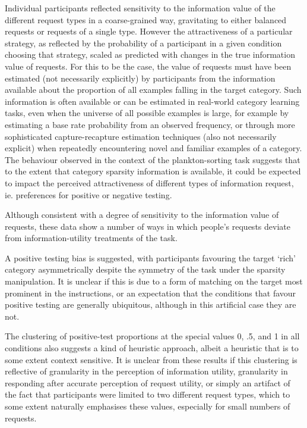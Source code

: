 \documentclass[10pt,letterpaper]{article}
\begin{document}
Individual participants reflected sensitivity to the information value of the different request types in a coarse-grained way, gravitating to either balanced requests or requests of a single type. However the attractiveness of a particular strategy, as reflected by the probability of a participant in a given condition choosing that strategy, scaled as predicted with changes in the true information value of requests. For this to be the case, the value of requests must have been estimated (not necessarily explicitly) by participants from the information available about the proportion of all examples falling in the target category. Such information is often available or can be estimated in real-world category learning tasks, even when the universe of all possible examples is large, for example by estimating a base rate probability from an observed frequency, or through more sophisticated capture-recapture estimation techniques \cite{pollock1990capturerecapture} (also not necessarily explicit) when repeatedly encountering novel and familiar examples of a category.%
The behaviour observed in the context of the plankton-sorting task suggests that to the extent that category sparsity information is available, it could be expected to impact the perceived attractiveness of different types of information request, ie. preferences for positive or negative testing.

Although consistent with a degree of sensitivity to the information value of requests, these data show a number of ways in which people's requests deviate from information-utility treatments of the task. 

A positive testing bias is suggested, with participants favouring the target `rich' category asymmetrically despite the symmetry of the task under the sparsity manipulation. It is unclear if this is due to a form of matching \cite{evans1998matching} on the target most prominent in the instructions, or an expectation that the conditions that favour positive testing are generally ubiquitous, although in this artificial case they are not.

The clustering of positive-test proportions at the special values 0, .5, and 1 in all conditions also suggests a kind of heuristic approach, albeit a heuristic that is to some extent context sensitive. It is unclear from these results if this clustering is reflective of granularity in the perception of information utility, granularity in responding after accurate perception of request utility, or simply an artifact of the fact that participants were limited to two different request types, which to some extent naturally emphasises these values, especially for small numbers of requests.
\end{document}
